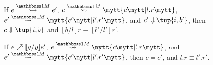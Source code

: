 \begin{figure*}
\begin{abstrsyn}
\begin{lemma} 
\label{lem:oneCorrect}
If $e \stepsym \bbonem e'$, $\splitone e A c {l.r}$, $\splitone {e'} A {c'} {l'.r'}$, and $\reduce {c'} {\tup{i,b'}}$,
then $\reduce c {\tup {i,b}}$ and $[b/l]r \equiv [b'/l']r'$.
\end{lemma}

\begin{lemma} 
\label{lem:hoistCorrect}
If ${e}\nearrow \llbracket q/y \rrbracket{e'}$, $\splitone e A c {l.r}$, and $\splitone {e'} A {c'} {l'.r'}$, then $c = c'$, and $l.r \equiv l'.r'$.
\end{lemma}







\end{abstrsyn}
\end{figure*}
